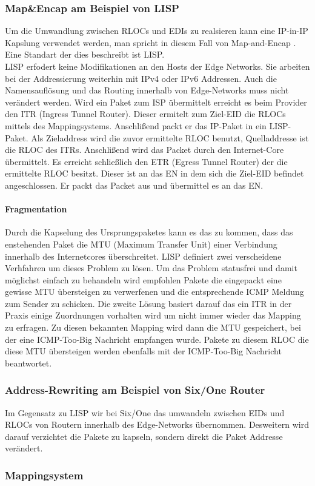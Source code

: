 \subsubsection{Map\&Encap am Beispiel von LISP}
Um die Umwandlung zwischen RLOCs und EDIs zu realsieren kann eine IP-in-IP Kapslung verwendet werden, man spricht in diesem Fall von Map-and-Encap \cite{deering:1996:map}. Eine Standart der dies beschreibt ist LISP. \\
LISP erfodert keine Modifikationen an den Hosts der Edge Networks. Sie arbeiten bei der Addressierung weiterhin mit IPv4 oder IPv6 Addressen. Auch die Namensauflösung und das Routing innerhalb von Edge-Networks muss nicht verändert werden. Wird ein Paket zum ISP übermittelt erreicht es beim Provider den ITR (Ingress Tunnel Router). Dieser ermitelt zum Ziel-EID die RLOCs mittels des Mappingsystems. Anschlißend packt er das IP-Paket in ein LISP-Paket. Als Zieladdress wird die zuvor ermittelte RLOC benutzt, Quelladdresse ist die RLOC des ITRs. Anschlißend wird das Packet durch den Internet-Core übermittelt. Es erreicht schließlich den ETR (Egress Tunnel Router) der die ermittelte RLOC besitzt. Dieser ist an das EN in dem sich die Ziel-EID befindet angeschlossen. Er packt das Packet aus und übermittel es an das EN. \\
\paragraph{Fragmentation} %
Durch die Kapselung des Ursprungspaketes kann es das zu kommen, dass das enstehenden Paket die MTU (Maximum Transfer Unit) einer Verbindung innerhalb des Internetcores überschreitet. LISP definiert zwei verscheidene Verhfahren um dieses Problem zu lösen. Um das Problem statusfrei und damit möglichst einfach zu behandeln wird empfohlen Pakete die eingepackt eine gewisse MTU übersteigen zu verwerfenen und die entsprechende ICMP Meldung zum Sender zu schicken. Die zweite Lösung basiert darauf das ein ITR in der Praxis einige Zuordnungen vorhalten wird um nicht immer wieder das Mapping zu erfragen. Zu diesen bekannten Mapping wird dann die MTU gespeichert, bei der eine ICMP-Too-Big Nachricht empfangen wurde. Pakete zu diesem RLOC die diese MTU übersteigen werden ebenfalls mit der ICMP-Too-Big Nachricht beantwortet.

\subsubsection{Address-Rewriting am Beispiel von Six/One Router}
Im Gegensatz zu LISP wir bei Six/One das umwandeln zwischen EIDs und RLOCs von Routern innerhalb des Edge-Networks übernommen. Desweitern wird darauf verzichtet die Pakete zu kapseln, sondern direkt die Paket Addresse verändert. 
 
\subsubsection{Mappingsystem}


